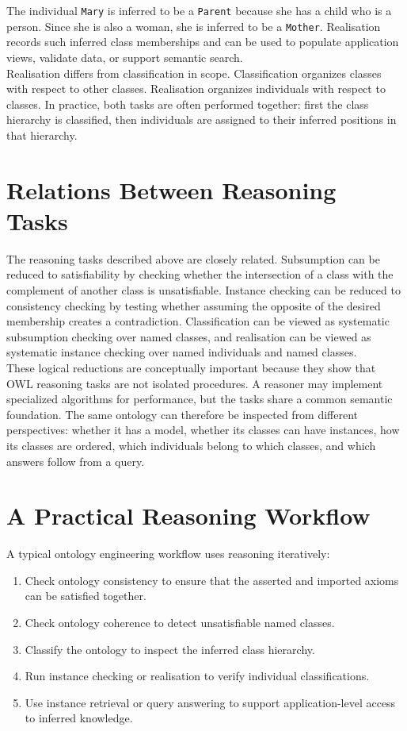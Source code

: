 \documentclass{scrbook}
\begin{document}
	The individual \texttt{Mary} is inferred to be a \texttt{Parent} because she has a child who is a person. Since she is also a woman, she is inferred to be a \texttt{Mother}. Realisation records such inferred class memberships and can be used to populate application views, validate data, or support semantic search.\\
	
	Realisation differs from classification in scope. Classification organizes classes with respect to other classes. Realisation organizes individuals with respect to classes. In practice, both tasks are often performed together: first the class hierarchy is classified, then individuals are assigned to their inferred positions in that hierarchy.
	
	\section{Relations Between Reasoning Tasks}
	
	The reasoning tasks described above are closely related. Subsumption can be reduced to satisfiability by checking whether the intersection of a class with the complement of another class is unsatisfiable. Instance checking can be reduced to consistency checking by testing whether assuming the opposite of the desired membership creates a contradiction. Classification can be viewed as systematic subsumption checking over named classes, and realisation can be viewed as systematic instance checking over named individuals and named classes.\\
	
	These logical reductions are conceptually important because they show that OWL reasoning tasks are not isolated procedures. A reasoner may implement specialized algorithms for performance, but the tasks share a common semantic foundation. The same ontology can therefore be inspected from different perspectives: whether it has a model, whether its classes can have instances, how its classes are ordered, which individuals belong to which classes, and which answers follow from a query.
	
	\section{A Practical Reasoning Workflow}
	
	A typical ontology engineering workflow uses reasoning iteratively:
	\begin{enumerate}
		\item Check ontology consistency to ensure that the asserted and imported axioms can be satisfied together.
		\item Check ontology coherence to detect unsatisfiable named classes.
		\item Classify the ontology to inspect the inferred class hierarchy.
		\item Run instance checking or realisation to verify individual classifications.
		\item Use instance retrieval or query answering to support application-level access to inferred knowledge.
	\end{enumerate}
	
\end{document}
